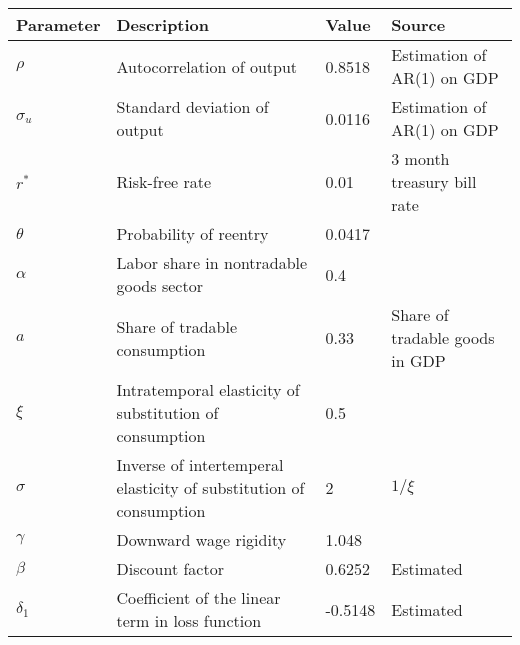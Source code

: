 \begin{table}[h]
    \centering
    \begin{tabular}{@{}llll@{}}
        \toprule
    Parameter  & Description                                                       & Value  & Source                                                                         \\ \midrule
    $\rho$     & Autocorrelation of output                                         & 0.8518 & Estimation of AR(1) on GDP\\
    $\sigma_u$ & Standard deviation of output                                      & 0.0116 & Estimation of AR(1) on GDP\\
    $r^*$      & Risk-free rate                                                    & 0.01 & 3 month treasury bill rate \\
    $\theta$   & Probability of reentry                                            & 0.0417 & \citet*{trebesch-2011-sovereign}                                              \\
    $\alpha$   & Labor share in nontradable goods sector                          & 0.4   & \citet{Pakistan-DSGE-calibration}                                                       \\
    $a$        & Share of tradable consumption                                     & 0.33   &Share of tradable goods in GDP                    \\
    $\xi$      & Intratemporal elasticity of substitution of consumption & 0.5   & \citet{Na-18}                              \\
    $\sigma$   & Inverse of intertemperal elasticity of substitution of consumption  & 2   & $1 / \xi$                                                                      \\
    $\gamma$   & Downward wage rigidity                                            & 1.048   & \citet*{wage-rigidity-data}                  \\
    $\beta$    & Discount factor                                                   & 0.6252  &  Estimated \\
    $\delta_1$ & Coefficient of the linear term in loss function                   &  -0.5148 &   Estimated  \\

\end{tabular}
\end{table}
